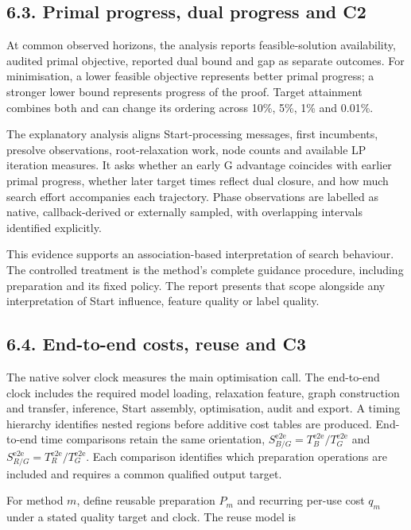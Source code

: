 \documentclass[
  british,
  10pt,
]{article}
\begin{document}
\subsection{6.3. Primal progress, dual progress and
C2}\label{primal-progress-dual-progress-and-c2}

At common observed horizons, the analysis reports feasible-solution
availability, audited primal objective, reported dual bound and gap as
separate outcomes. For minimisation, a lower feasible objective
represents better primal progress; a stronger lower bound represents
progress of the proof. Target attainment combines both and can change
its ordering across 10\%, 5\%, 1\% and 0.01\%.

The explanatory analysis aligns Start-processing messages, first
incumbents, presolve observations, root-relaxation work, node counts and
available LP iteration measures. It asks whether an early G advantage
coincides with earlier primal progress, whether later target times
reflect dual closure, and how much search effort accompanies each
trajectory. Phase observations are labelled as native, callback-derived
or externally sampled, with overlapping intervals identified explicitly.

This evidence supports an association-based interpretation of search
behaviour. The controlled treatment is the method's complete guidance
procedure, including preparation and its fixed policy. The report
presents that scope alongside any interpretation of Start influence,
feature quality or label quality.

\subsection{6.4. End-to-end costs, reuse and
C3}\label{end-to-end-costs-reuse-and-c3}

The native solver clock measures the main optimisation call. The
end-to-end clock includes the required model loading, relaxation
feature, graph construction and transfer, inference, Start assembly,
optimisation, audit and export. A timing hierarchy identifies nested
regions before additive cost tables are produced. End-to-end time
comparisons retain the same orientation,
\(S^{\mathrm{e2e}}_{B/G}=T^{\mathrm{e2e}}_B/T^{\mathrm{e2e}}_G\) and
\(S^{\mathrm{e2e}}_{R/G}=T^{\mathrm{e2e}}_R/T^{\mathrm{e2e}}_G\). Each
comparison identifies which preparation operations are included and
requires a common qualified output target.

For method \(m\), define reusable preparation \(P_m\) and recurring
per-use cost \(q_m\) under a stated quality target and clock. The reuse
model is
\end{document}
